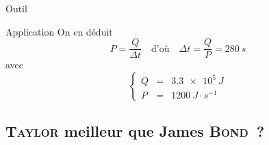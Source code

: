 \documentclass[../main/main.tex]{subfiles}
\begin{document}
\begin{enumerate}
\begin{tcbraster}[raster columns=2, raster equal height=rows]
\begin{tcolorbox}[blankest, raster multicolumn=1, space to=\myspace]
\begin{tcbraster}[raster columns=1]
\begin{NCrapp}[]{Outil}
				      \end{NCrapp}
			      \end{tcbraster}
		      \end{tcolorbox}
		      \begin{NCexem}[raster multicolumn=1]{Application}
			      On en déduit
			      \[P = \frac{Q}{\Delta t}
				      \quad\text{d'où}\quad
				      \boxed{\Delta t = \frac{Q}{P} = \SI{280}{s}}\]
			      avec
			      \[\left\{
				      \begin{array}{rcl}
					      Q & = & \SI{3.3e5}{J}            \\
					      P & = & \SI{1200}{J\cdot s^{-1}}
				      \end{array}
				      \right.\]
		      \end{NCexem}
	      \end{tcbraster}
\end{enumerate}

\subsection{\textsc{Taylor} meilleur que James \textsc{Bond}~?}
\end{document}
